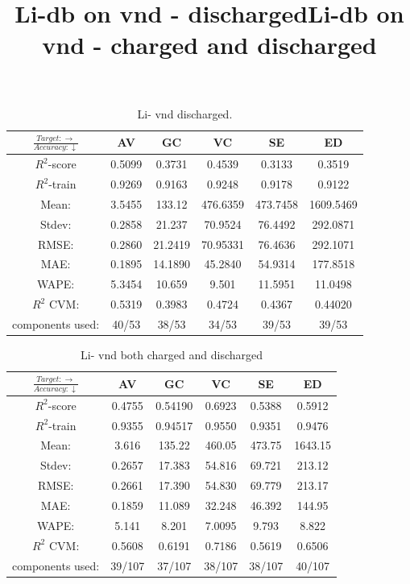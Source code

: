 \begin{table}[h]
\normalsize
\title{Li-db on vnd - discharged}
\centering
\caption{Li- vnd discharged.}
\begin{tabular}{|c|c|c|c|c|c|}
	\hline 
	$\frac{Target: \rightarrow}{Accuracy:\downarrow} $ & AV & GC & VC & SE & ED 
	 \\ 
	\hline
	$R^2$-score 	& 0.5099 &  0.3731 & 0.4539 & 0.3133 &  0.3519\\ 
	\hline 
	$R^2$-train  	 & 0.9269 & 0.9163 & 0.9248 & 0.9178 & 0.9122 \\ 
	\hline
	Mean:	 	 &3.5455	& 133.12&476.6359&473.7458	&1609.5469\\
	\hline 
	Stdev:		 &0.2858	&21.237&70.9524&76.4492&292.0871\\
	\hline
	RMSE:		 & 0.2860 & 21.2419& 70.95331 & 76.4636 & 292.1071 \\ 
	\hline 
	MAE:	 	&0.1895& 14.1890 &  45.2840 & 54.9314 & 177.8518 \\ 
	\hline
	WAPE: 		& 5.3454 & 10.659 & 9.501  & 11.5951 &11.0498 \\
	\hline
	$R^2$ CVM: &  0.5319 & 0.3983 & 0.4724  &  0.4367 &0.44020 \\
	\hline
	components used: & 40/53 &  38/53 &  34/53  &  39/53 & 39/53 \\
	\hline
\end{tabular}
\label{tab:Li-vnd-ii}
\end{table}

\begin{table}[h]
\normalsize
\title{Li-db on vnd - charged and discharged}
\centering
\caption{Li- vnd both charged and discharged}
\begin{tabular}{|c|c|c|c|c|c|}
	\hline 
	$\frac{Target: \rightarrow}{Accuracy:\downarrow} $ & AV & GC & VC & SE & ED 
	 \\ 
	\hline
	$R^2$-score 	& 0.4755 & 0.54190 & 0.6923 & 0.5388 &  0.5912\\ 
	\hline 
	$R^2$-train 	& 0.9355 & 0.94517 & 0.9550 &   0.9351 & 0.9476 \\ 
	\hline
	Mean: 		&3.616	&135.22&460.05&473.75	&1643.15	\\
	\hline 
	Stdev:	 	&0.2657	&17.383	&54.816	&69.721	&213.12	\\
	\hline
	RMSE: 		& 0.2661 & 17.390	& 54.830 & 69.779	 & 213.17 \\ 
	\hline 
	MAE: 		&0.1859& 11.089	 &  32.248 & 46.392 & 144.95 \\ 
	\hline
	WAPE: 		& 5.141 & 8.201 	&  7.0095  & 9.793 &8.822 \\
	\hline
	$R^2$ CVM: 	&  0.5608 & 0.6191 & 0.7186  & 0.5619 &0.6506 \\
	\hline
	components used: & 39/107 & 37/107 & 38/107  & 38/107 &40/107 \\
	\hline
\end{tabular}
\label{tab:Li-vnd-iii}
\end{table}






